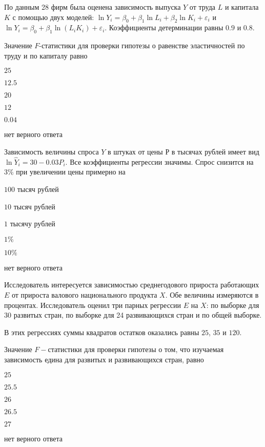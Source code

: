 \begin{question}
По данным 28 фирм была оценена зависимость выпуска $Y$ от труда $L$ и капитала $K$ с помощью двух моделей: $\ln Y_i = \beta_0 + \beta_1 \ln L_i + \beta_2 \ln K_i + \varepsilon_i$ и $\ln Y_i = \beta_0 + \beta_1 \ln (L_i  K_i) + \varepsilon_i$. Коэффициенты детерминации равны $0.9$ и $0.8$. 

Значение $F$-статистики для проверки гипотезы о равенстве эластичностей по труду и по капиталу равно
\begin{answerlist}
  \item $25$
  \item $12.5$
  \item $20$
  \item $12$
  \item $0.04$
  \item нет верного ответа
\end{answerlist}
\end{question}

\begin{question}
Зависимость величины спроса $Y$ в штуках от цены $Р$ в тысячах рублей имеет вид $\ln \hat Y_i = 30 - 0.03 P_i$. Все коэффициенты регрессии значимы. Спрос снизится на 3\% при увеличении цены примерно на
\begin{answerlist}
  \item $100$ тысяч рублей
  \item $10$ тысяч рублей
  \item $1$ тысячу рублей
  \item $1\%$ 
  \item $10\%$
  \item нет верного ответа
\end{answerlist}
\end{question}

\begin{question}
Исследователь интересуется зависимостью среднегодового прироста работающих $E$ от прироста валового национального продукта $X$. Обе величины измеряются в процентах. Исследователь оценил три парных регрессии $E$ на $X$: по выборке для 30 развитых  стран, по выборке для 24 развивающихся стран и по общей выборке.

В этих регрессиях суммы квадратов остатков оказались равны $25$, $35$ и $120$.

Значение $F-$статистики для проверки гипотезы о том, что изучаемая зависимость едина для развитых и развивающихся стран, равно
\begin{answerlist}
    \item $25$
    \item $25.5$  
    \item $26$
  \item $26.5$
  \item $27$
  \item нет верного ответа
\end{answerlist}
\end{question}

